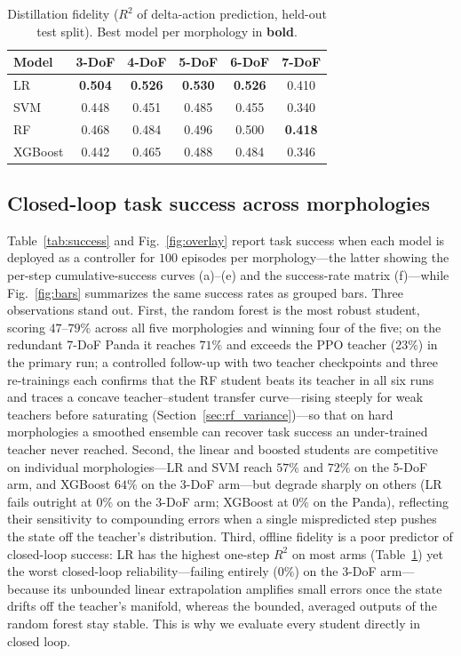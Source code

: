 \documentclass[conference]{IEEEtran}
\begin{document}
\begin{table}[t]
\centering
\caption{Distillation fidelity ($R^2$ of delta-action prediction, held-out test
split). Best model per morphology in \textbf{bold}.}
\label{tab:r2}
\begin{tabular}{lccccc}
\toprule
\textbf{Model} & \textbf{3-DoF} & \textbf{4-DoF} & \textbf{5-DoF} & \textbf{6-DoF} & \textbf{7-DoF} \\
\midrule
LR      & \textbf{0.504} & \textbf{0.526} & \textbf{0.530} & \textbf{0.526} & 0.410 \\
SVM     & 0.448 & 0.451 & 0.485 & 0.455 & 0.340 \\
RF      & 0.468 & 0.484 & 0.496 & 0.500 & \textbf{0.418} \\
XGBoost & 0.442 & 0.465 & 0.488 & 0.484 & 0.346 \\
\bottomrule
\end{tabular}
\end{table}

\subsection{Closed-loop task success across morphologies}
Table~\ref{tab:success} and Fig.~\ref{fig:overlay} report task success when each
model is deployed as a controller for $100$ episodes per morphology---the latter
showing the per-step cumulative-success curves (a)--(e) and the success-rate
matrix (f)---while Fig.~\ref{fig:bars} summarizes the same success
rates as grouped bars. Three observations stand out. First, the
random forest is the most robust student, scoring $47$--$79\%$ across all
five morphologies and winning four of the five; on the redundant 7-DoF Panda it
reaches $71\%$ and exceeds the PPO teacher ($23\%$) in the primary run; a
controlled follow-up with two teacher checkpoints and three re-trainings each
confirms that the RF student beats its teacher in all six runs and traces a
concave teacher--student transfer curve---rising steeply for weak teachers
before saturating (Section~\ref{sec:rf_variance})---so that on hard morphologies
a smoothed ensemble can recover task success an under-trained teacher never
reached. Second, the linear and boosted students are competitive on individual
morphologies---LR and SVM reach $57\%$ and $72\%$ on the 5-DoF arm, and XGBoost
$64\%$ on the 3-DoF arm---but degrade sharply on others (LR fails outright at
$0\%$ on the 3-DoF arm; XGBoost at $0\%$ on the Panda), reflecting their
sensitivity to compounding errors when a single mispredicted step pushes the
state off the teacher's distribution. Third, offline fidelity is a poor predictor
of closed-loop success: LR has the highest one-step $R^2$ on most arms
(Table~\ref{tab:r2}) yet the worst closed-loop reliability---failing
entirely ($0\%$) on the 3-DoF arm---because its unbounded linear extrapolation
amplifies small errors once the state drifts off the teacher's manifold, whereas
the bounded, averaged outputs of the random forest stay stable. This is why we
evaluate every student directly in closed loop.
\end{document}
